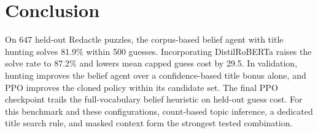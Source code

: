 \documentclass[conference]{IEEEtran}
\begin{document}
\section{Conclusion}
On 647 held-out Redactle puzzles, the corpus-based belief agent with title hunting solves 81.9\% within 500 guesses. Incorporating DistilRoBERTa raises the solve rate to 87.2\% and lowers mean capped guess cost by 29.5. In validation, hunting improves the belief agent over a confidence-based title bonus alone, and PPO improves the cloned policy within its candidate set. The final PPO checkpoint trails the full-vocabulary belief heuristic on held-out guess cost. For this benchmark and these configurations, count-based topic inference, a dedicated title search rule, and masked context form the strongest tested combination.



\end{document}
